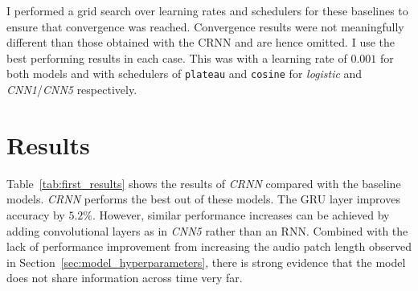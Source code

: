 I performed a grid search over learning rates and schedulers for these baselines to ensure that convergence was reached. Convergence results were not meaningfully different than those obtained with the CRNN and are hence omitted. I use the best performing results in each case. This was with a learning rate of $0.001$ for both models and with schedulers of \texttt{plateau} and \texttt{cosine} for \emph{logistic} and \emph{CNN1}/\emph{CNN5} respectively.



\section{Results}

Table~\ref{tab:first_results} shows the results of \emph{CRNN} compared with the baseline models. \emph{CRNN} performs the best out of these models. The GRU layer improves accuracy by $5.2\%$. However, similar performance increases can be achieved by adding convolutional layers as in \emph{CNN5} rather than an RNN. Combined with the lack of performance improvement from increasing the audio patch length observed in Section~\ref{sec:model_hyperparameters}, there is strong evidence that the model does not share information across time very far.

